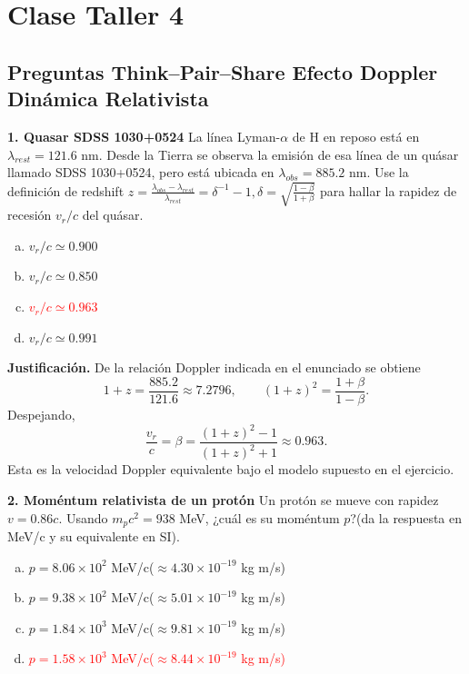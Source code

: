 \chapter{Clase Taller 4}

\section{Preguntas Think--Pair--Share Efecto Doppler Dinámica Relativista}

\textbf{1. Quasar SDSS 1030+0524}
La línea Lyman-$\alpha$ de H en reposo está en $\lambda_{rest}= 121.6$ nm. Desde la Tierra se observa la emisión de esa línea de un quásar llamado SDSS 1030+0524, pero está ubicada en $\lambda_{obs}= 885.2$ nm. Use la definición de redshift
$z= \frac{\lambda_{obs} - \lambda_{rest}}{\lambda_{rest}} = \delta^{-1} -1, \delta=\sqrt{\frac{1 - \beta}{1+ \beta}}$
para hallar la rapidez de recesión $v_r/c$ del quásar.
\begin{enumerate}[a)]
    \item $v_r/c \simeq 0.900$
    \item $v_r/c \simeq 0.850$
    \item \textcolor{red}{$v_r/c \simeq 0.963$}
    \item $v_r/c \simeq 0.991$
\end{enumerate}

\textbf{Justificación.} De la relación Doppler indicada en el enunciado se obtiene
\[
1+z=\frac{885.2}{121.6}\approx7.2796,
\qquad
(1+z)^2=\frac{1+\beta}{1-\beta}.
\]
Despejando,
\[
\frac{v_r}{c}=\beta=\frac{(1+z)^2-1}{(1+z)^2+1}\approx0.963.
\]
Esta es la velocidad Doppler equivalente bajo el modelo supuesto en el ejercicio.

\textbf{2. Moméntum relativista de un protón}
Un protón se mueve con rapidez $v= 0.86 c$. Usando $m_p c^2= 938$ MeV, ¿cuál es su moméntum $p$?(da la respuesta en MeV/c y su equivalente en SI).
\begin{enumerate}[a)]
    \item $p= 8.06 \times 10^2$ MeV/c($\approx 4.30 \times 10^{-19}$ kg m/s)
    \item $p= 9.38 \times 10^2$ MeV/c($\approx 5.01 \times 10^{-19}$ kg m/s)
    \item $p= 1.84 \times 10^3$ MeV/c($\approx 9.81 \times 10^{-19}$ kg m/s)
    \item \textcolor{red}{$p= 1.58 \times 10^3$ MeV/c($\approx 8.44 \times 10^{-19}$ kg m/s)}
\end{enumerate}

